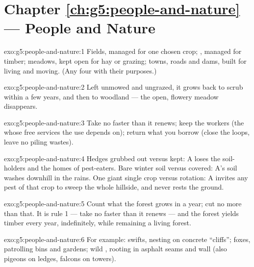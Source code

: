 \section*{Chapter \ref{ch:g5:people-and-nature} --- People and Nature}

\begin{solution}{exo:g5:people-and-nature:1}
Fields, managed for one chosen crop; , managed for
timber; meadows, kept open for hay or grazing; towns, roads
and dams, built for living and moving. (Any four with their
purposes.)
\end{solution}

\begin{solution}{exo:g5:people-and-nature:2}
Left unmowed and ungrazed, it grows back to scrub within a
few years, and then to woodland --- the open, flowery meadow
 disappears.
\end{solution}

\begin{solution}{exo:g5:people-and-nature:3}
Take no faster than it renews; keep the workers (the 
whose free services the use depends on); return what you
borrow (close the loops, leave no piling wastes).
\end{solution}

\begin{solution}{exo:g5:people-and-nature:4}
Hedges grubbed out versus kept: A loses the soil-holders and
the homes of pest-eaters. Bare winter soil versus covered:
A's soil washes downhill in the rains. One giant single crop
versus rotation: A invites any pest of that crop to sweep the
whole hillside, and never rests the ground.
\end{solution}

\begin{solution}{exo:g5:people-and-nature:5}
Count what the forest grows in a year; cut no more than
that. It is rule 1 --- take no faster than it renews --- and
the forest yields timber every year, indefinitely, while
remaining a living forest.
\end{solution}

\begin{solution}{exo:g5:people-and-nature:6}
For example: swifts, nesting on concrete ``cliffs''; foxes,
patrolling bins and gardens; wild , rooting in asphalt
seams and wall  (also pigeons on ledges, falcons on
towers).
\end{solution}

